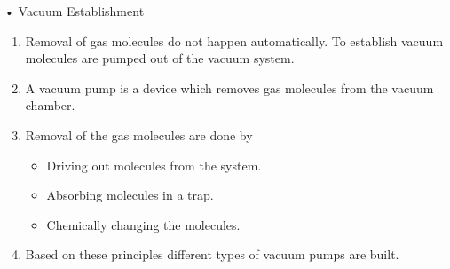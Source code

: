 \documentclass[11]{beamer}
\begin{document}
\begin{frame}{• Vacuum Establishment}

\begin{exampleblock}

\begin{enumerate}

\item Removal of gas molecules do not happen automatically. To establish vacuum molecules are pumped out of the vacuum system.
\item A vacuum pump is a device which removes gas molecules from the vacuum chamber. 
\item Removal of the gas molecules are done by 
\begin{itemize}
 \item Driving out molecules from the system.
 \item Absorbing molecules in a trap.
 \item Chemically changing the molecules.
\end{itemize}
 
\item Based on these principles different types of vacuum pumps are built.

\end{enumerate}

\end{exampleblock}		


\end{frame}
\end{document}
